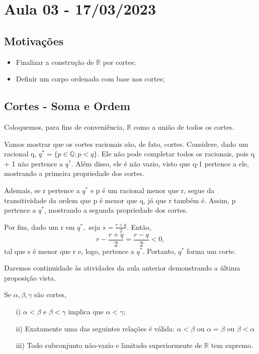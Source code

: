 \documentclass[analysis_notes.tex]{subfiles}
\begin{document}
\section{Aula 03 - 17/03/2023}
\subsection{Motiva\c c\~oes}
\begin{itemize}
	\item Finalizar a constru\c c\~ao de $\mathbb{R}$ por cortes;
	\item Definir um corpo ordenado com base nos cortes;
\end{itemize}
\subsection{Cortes - Soma e Ordem}
Coloquemos, para fins de conveni\^encia, $\mathbb{R}$ como a uni\~ao de todos os cortes.

Vamos mostrar que os cortes racionais s\~ao, de fato, cortes. Considere, dado um racional q, $q^{*} = \{p\in \mathbb{Q}: p < q\}.$
Ele n\~ao pode completar todos os racionais, pois q + 1 n\~ao pertence a $q^{*}$. Al\'em disso, ele \'e n\~ao vazio, visto que
q-1 pertence a ele, mostrando a primeira propriedade dos cortes.

Ademais, se r pertence a $q^{*}$ e p \'e um racional menor que r, segue da transitividade da ordem que p \'e menor que
q, j\'a que r tamb\'em \'e. Assim, p pertence a $q^{*}$, mostrando a segunda propriedade dos cortes.

Por fim, dado um r em $q^{*},$ seja $s = \displaystyle \frac{r + q}{2}$. Ent\~ao,
$$
	r - \frac{r+q}{2} = \frac{r - q}{2} < 0,
$$
tal que s \'e menor que r e, logo, pertence a $q^{*}$. Portanto, $q^{*}$ forma um corte.

Daremos continuidade \`as atividades da aula anterior demonstrando a \'ultima proposi\c c\~ao vista.
\begin{prop*}
	Se $\alpha, \beta, \gamma$ s\~ao cortes,
	\begin{itemize}
		\item[i)] $\alpha < \beta$ e $\beta < \gamma$ implica que $\alpha < \gamma$;
		\item[ii)] Exatamente uma das seguintes rela\c c\~oes \'e v\'alida: $\alpha < \beta$ ou $\alpha = \beta$ ou $\beta < \alpha$
		\item[iii)] Todo subconjunto n\~ao-vazio e limitado superiormente de $\mathbb{R}$ tem supremo.
	\end{itemize}
\end{prop*}
\end{document}
